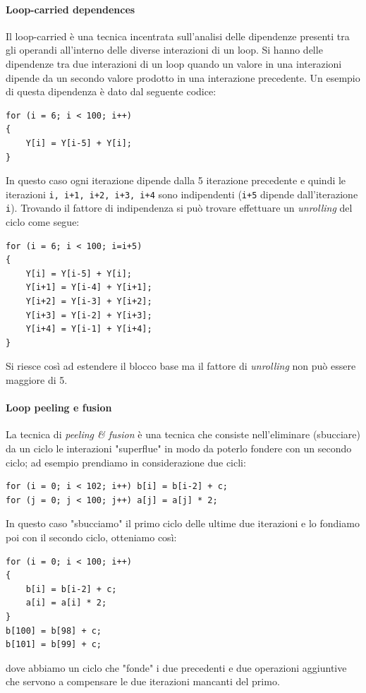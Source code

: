 \paragraph{Loop-carried dependences}
Il loop-carried è una tecnica incentrata sull'analisi delle dipendenze presenti tra gli operandi all'interno delle diverse interazioni di un loop. Si hanno delle dipendenze tra due interazioni di un loop quando un valore in una interazioni dipende da un secondo valore prodotto in una interazione precedente. Un esempio di questa dipendenza è dato dal seguente codice:
\begin{verbatim}
for (i = 6; i < 100; i++)
{
	Y[i] = Y[i-5] + Y[i];
}
\end{verbatim}
In questo caso ogni iterazione dipende dalla 5 iterazione precedente e quindi le iterazioni \texttt{i, i+1, i+2, i+3, i+4} sono indipendenti (\texttt{i+5} dipende dall'iterazione \texttt{i}). Trovando il fattore di indipendenza si può trovare effettuare un \emph{unrolling} del ciclo come segue:
\begin{verbatim}
for (i = 6; i < 100; i=i+5)
{
	Y[i] = Y[i-5] + Y[i];
	Y[i+1] = Y[i-4] + Y[i+1];
	Y[i+2] = Y[i-3] + Y[i+2];
	Y[i+3] = Y[i-2] + Y[i+3];
	Y[i+4] = Y[i-1] + Y[i+4];
}
\end{verbatim}
Si riesce così ad estendere il blocco base ma il fattore di \emph{unrolling} non può essere maggiore di 5.
\paragraph{Loop peeling e fusion}
La tecnica di \emph{peeling \& fusion} è una tecnica che consiste nell'eliminare (sbucciare) da un ciclo le interazioni "superflue" in modo da poterlo fondere con un secondo ciclo; ad esempio prendiamo in considerazione due cicli:
\begin{verbatim}
for (i = 0; i < 102; i++) b[i] = b[i-2] + c;
for (j = 0; j < 100; j++) a[j] = a[j] * 2;
\end{verbatim}
In questo caso "sbucciamo" il primo ciclo delle ultime due iterazioni e lo fondiamo poi con il secondo ciclo, otteniamo così:
\begin{verbatim}
for (i = 0; i < 100; i++)
{
	b[i] = b[i-2] + c;
	a[i] = a[i] * 2;
}
b[100] = b[98] + c;
b[101] = b[99] + c;
\end{verbatim}
dove abbiamo un ciclo che "fonde" i due precedenti e due operazioni aggiuntive che servono a compensare le due iterazioni mancanti del primo.
